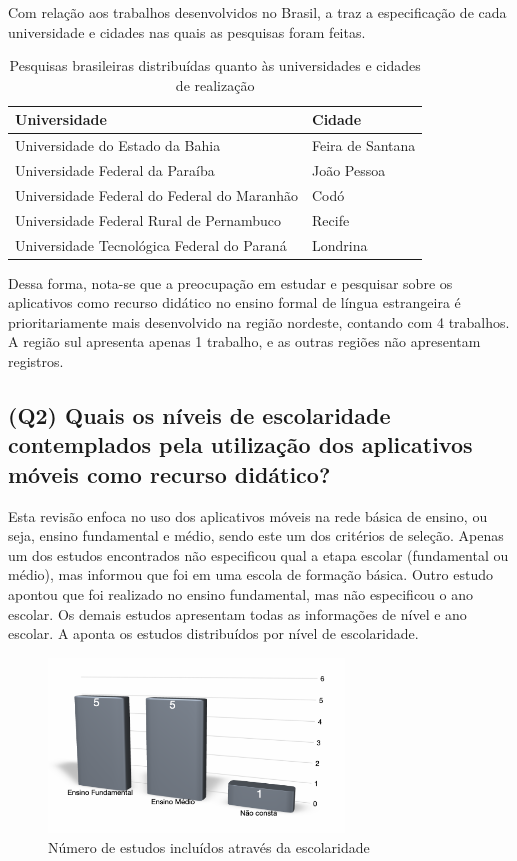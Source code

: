 \documentclass{textolivre}
\begin{document}
Com relação aos trabalhos desenvolvidos no Brasil, a  traz a especificação de cada universidade e cidades nas quais as pesquisas foram feitas.

\begin{table}[htpb]
\caption{Pesquisas brasileiras distribuídas quanto às universidades e cidades de realização}
\label{tab4}
\centering
\begin{tabular}{ll}
\toprule 
Universidade & Cidade
\\
\midrule
Universidade do Estado da Bahia	& Feira de Santana
\\
Universidade Federal da Paraíba	& João Pessoa
\\
Universidade Federal do Federal do Maranhão	& Codó
\\
Universidade Federal Rural de Pernambuco & Recife
\\
Universidade Tecnológica Federal do Paraná & Londrina
\\ 
\bottomrule
\end{tabular}
\centering
\end{table}

Dessa forma, nota-se que a preocupação em estudar e pesquisar sobre os aplicativos como recurso didático no ensino formal de língua estrangeira é prioritariamente mais desenvolvido na região nordeste, contando com 4 trabalhos. A região sul apresenta apenas 1 trabalho, e as outras regiões não apresentam registros. 

\subsection{(Q2) Quais os níveis de escolaridade contemplados pela utilização dos aplicativos móveis como recurso didático?}
Esta revisão enfoca no uso dos aplicativos móveis na rede básica de ensino, ou seja, ensino fundamental e médio, sendo este um dos critérios de seleção. Apenas um dos estudos encontrados \cite{almeida2018} não especificou qual a etapa escolar (fundamental ou médio), mas informou que foi em uma escola de formação básica. Outro estudo apontou que foi realizado no ensino fundamental, mas não especificou o ano escolar. Os demais estudos apresentam todas as informações de nível e ano escolar. A  aponta os estudos distribuídos por nível de escolaridade. 

\begin{figure}[htbp]
 \centering
 \includegraphics[width=0.7\textwidth]{fig5.png}
 \caption{Número de estudos incluídos através da escolaridade}
 \label{fig5}
\end{figure}
\end{document}
